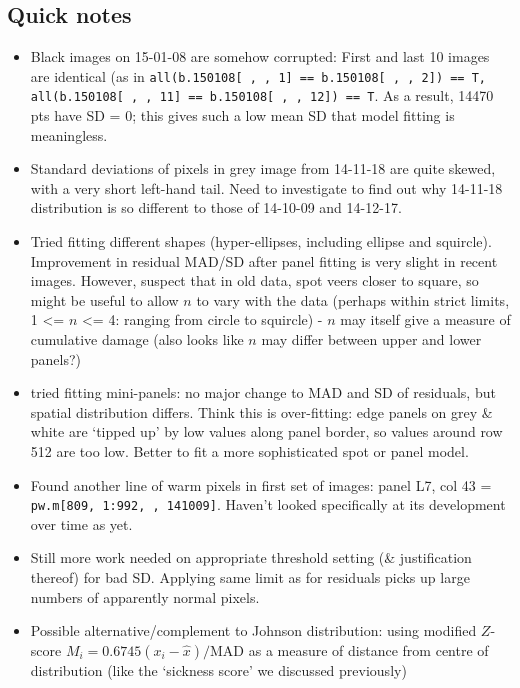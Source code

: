 \documentclass[10pt,fleqn]{article}
\begin{document}
\subsection*{Quick notes}

\begin{itemize}

\item
Black images on 15-01-08 are somehow corrupted: First and last 10 images are identical (as in \texttt{all(b.150108[ , , 1] == b.150108[ , , 2]) == T, all(b.150108[ , , 11] == b.150108[ , , 12]) == T}. As a result, 14470 pts have SD = 0; this gives such a low mean SD that model fitting is meaningless.

\item Standard deviations of pixels in grey image from 14-11-18 are quite skewed, with a very short left-hand tail. Need to investigate to find out why 14-11-18 distribution is so different to those of 14-10-09 and 14-12-17.
 
\item Tried fitting different shapes (hyper-ellipses, including ellipse and squircle). Improvement in residual MAD/SD after panel fitting is very slight in recent images. However, suspect that in old data, spot veers closer to square, so might be useful to allow $n$ to vary with the data (perhaps within strict limits, 1 <= $n$ <= 4: ranging from circle to squircle) - $n$ may itself give a measure of cumulative damage (also looks like $n$ may differ between upper and lower panels?) 

\item tried fitting mini-panels: no major change to MAD and SD of residuals, but spatial distribution differs. Think this is over-fitting: edge panels on grey \& white are `tipped up' by low values along panel border, so values around row 512 are too low. Better to fit a more sophisticated spot or panel model.

\item Found another line of warm pixels in first set of images: panel L7, col 43 = \texttt{pw.m[809, 1:992, , 141009]}. Haven't looked specifically at its development over time as yet.

\item Still more work needed on appropriate threshold setting (\& justification thereof) for bad SD. Applying same limit as for residuals picks up large numbers of apparently normal pixels. 

\item Possible alternative/complement to Johnson distribution: using modified $Z$-score $M_i = 0.6745 (x_i - \hat{x} )/ \text{MAD}$ as a measure of distance from centre of distribution (like the `sickness score' we discussed previously)

\end{itemize}
\end{document}
